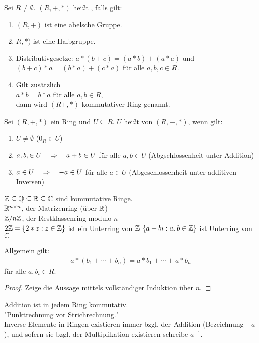 \begin{defin}
	Sei $R \neq \emptyset$. $(R, + , *)$ heißt , falls gilt:
	\begin{enumerate}
		\item $(R,+)$ ist eine abelsche Gruppe.
		\item $R,*)$ ist eine Halbgruppe.
		\item Distributivgesetze: $a*(b+c) = (a*b)+(a*c)$ und $(b+c)*a = (b*a) + (c*a)$ für alle $a,b,c \in R$.
		\item Gilt zusätzlich \\
		$a*b = b*a$ für alle $a,b \in R$, \\
		dann wird $(R+,*)$ kommutativer Ring genannt.
	\end{enumerate}
\end{defin}
%
\begin{defin}
	Sei $(R,+,*)$ ein Ring und $U \subseteq R$. $U$ heißt  von $(R,+,*)$, wenn gilt:
	\begin{enumerate}
		\item $U \neq \emptyset$ ($0_R \in U$)
		\item $a,b, \in U \quad \Rightarrow \quad a+b \in U$ für alle $a,b \in U$ (Abgschlossenheit unter Addition)
		\item $a \in U \quad \Rightarrow \quad -a \in U$ für alle $a \in U$ (Abgeschlossenheit unter additiven Inversen)
	\end{enumerate}
\end{defin}
%
\begin{bsp}
	$\mathbb{Z} \subseteq \mathbb{Q} \subseteq \mathbb{R} \subseteq \mathbb{C}$ sind kommutative Ringe. \\
	$\mathbb{R}^{n \times n}$, der Matrizenring (über $\mathbb{R}$) \\
	$\mathbb{Z} / n \mathbb{Z}$, der Restklassenring modulo $n$ \\
	$2\mathbb{Z} = \{ 2*z : z \in \mathbb{Z} \}$ ist ein Unterring von $\mathbb{Z}$
	$\{ a+bi : a,b \in \mathbb{Z} \}$ ist Unterring von $\mathbb{C}$
\end{bsp}
%
\begin{bem}
	Allgemein gilt:
	\begin{align*}
		a * (b_1 + \cdots + b_n) = a*b_1 + \cdots + a*b_n
	\end{align*}
	für alle $a,b_i \in R$.
\end{bem}
\begin{proof}
	Zeige die Aussage mittels vollständiger Induktion über $n$.
\end{proof}
%
\begin{bem}
	Addition ist in jedem Ring kommutativ. \\
	"Punktrechnung vor Strichrechnung." \\
	Inverse Elemente in Ringen existieren immer bzgl. der Addition (Bezeichnung $-a$), und sofern sie bzgl. der Multiplikation existieren schreibe $a^{-1}$.
\end{bem}
